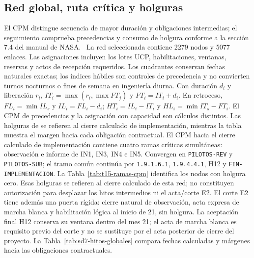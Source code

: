 \subsection{Red global, ruta crítica y holguras}
El CPM distingue secuencia de mayor duración y obligaciones intermedias; el seguimiento comprueba precedencias y consumo de holgura conforme a la sección 7.4 del manual de NASA.~\parencite[pp.~59--60]{nasa-cronograma} La red seleccionada contiene 2279 nodos y 5077 enlaces. Las asignaciones incluyen los lotes UCP, habilitaciones, ventanas, reservas y actos de recepción requeridos. Los cuadrantes conservan fechas naturales exactas; los índices hábiles son controles de precedencia y no convierten turnos nocturnos o fines de semana en ingeniería diurna.
Con duración $d_i$ y liberación $r_i$, $IT_i=\max(r_i,\max FT_j)$ y $FT_i=IT_i+d_i$. En retroceso, $FL_i=\min IL_s$ y $IL_i=FL_i-d_i$; $HT_i=IL_i-IT_i$ y $HL_i=\min IT_s-FT_i$. El CPM de precedencias y la asignación con capacidad son cálculos distintos. Las holguras de  se refieren al cierre calculado de implementación, mientras la tabla muestra el margen hacia cada obligación contractual.
El CPM hacia el cierre calculado de implementación contiene cuatro ramas críticas simultáneas: observación e informe de IN1, IN3, IN4 e IN5. Convergen en \texttt{PILOTOS-REV} y \texttt{PILOTOS-SUB}; el tramo común continúa por \texttt{1.9.1.6.1}, \texttt{1.9.4.4.1}, H12 y \texttt{FIN-IMPLEMENTACION}. La Tabla~\ref{tab:t15-ramas-cpm} identifica los nodos con holgura cero. Esas holguras se refieren al cierre calculado de esta red; no constituyen autorización para desplazar los hitos intermedios ni el acta/corte E2. El corte E2 tiene además una puerta rígida: cierre natural de observación, acta expresa de marcha blanca y habilitación lógica al inicio de 21, sin holgura. La aceptación final H12 conserva su ventana dentro del mes 21; el acta de marcha blanca es requisito previo del corte y no se sustituye por el acta posterior de cierre del proyecto.
La Tabla~\ref{tab:sd7-hitos-globales} compara fechas calculadas y márgenes hacia las obligaciones contractuales.
